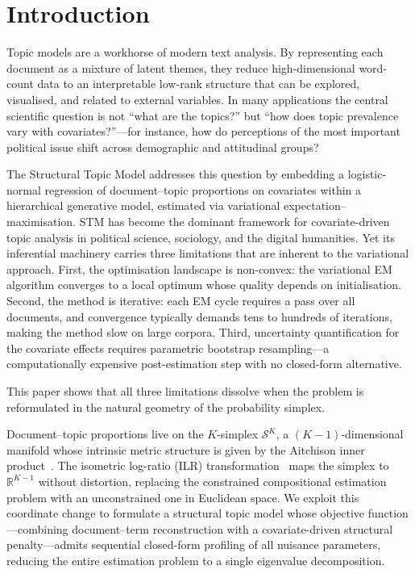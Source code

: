 \section{Introduction}
\label{sec:introduction}
 
Topic models are a workhorse of modern text analysis. By representing
each document as a mixture of latent themes, they reduce
high-dimensional word-count data to an interpretable low-rank
structure that can be explored, visualised, and related to external
variables. In many applications the central scientific question is not
``what are the topics?'' but ``how does topic prevalence vary with
covariates?''---for instance, how do perceptions of the most important
political issue shift across demographic and attitudinal groups?
 
The Structural Topic Model \citep[STM,][]{roberts2014stm} addresses
this question by embedding a logistic-normal regression of
document--topic proportions on covariates within a hierarchical
generative model, estimated via variational expectation--maximisation.
STM has become the dominant framework for covariate-driven topic
analysis in political science, sociology, and the digital humanities.
Yet its inferential machinery carries three limitations that are
inherent to the variational approach.
First, the optimisation landscape is non-convex: the variational EM
algorithm converges to a local optimum whose quality depends on
initialisation.
Second, the method is iterative: each EM cycle requires a pass over
all documents, and convergence typically demands tens to hundreds of
iterations, making the method slow on large corpora.
Third, uncertainty quantification for the covariate effects requires
parametric bootstrap resampling---a computationally expensive
post-estimation step with no closed-form alternative.
 
This paper shows that all three limitations dissolve when the problem
is reformulated in the natural geometry of the probability simplex.
 
Document--topic proportions live on the $K$-simplex
$\mathcal{S}^K$, a $(K{-}1)$-dimensional manifold whose intrinsic
metric structure is given by the Aitchison inner
product~\citep{aitchison1986statistical}.
The isometric log-ratio (ILR)
transformation~\citep{egozcue2003isometric} maps the simplex to
$\mathbb{R}^{K-1}$ without distortion, replacing the constrained
compositional estimation problem with an unconstrained one in
Euclidean space. We exploit this coordinate change to formulate a
structural topic model whose objective function---combining
document--term reconstruction with a covariate-driven structural
penalty---admits sequential closed-form profiling of all nuisance
parameters, reducing the entire estimation problem to a single
eigenvalue decomposition.
 
